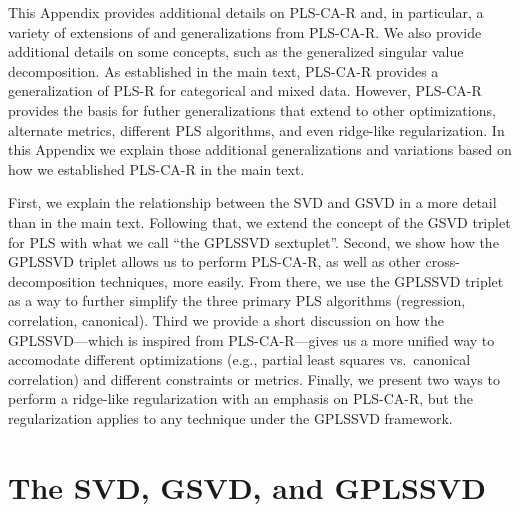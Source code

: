 \documentclass[12pt]{article}
\begin{document}
This Appendix provides additional details on PLS-CA-R and, in
particular, a variety of extensions of and generalizations from
PLS-CA-R. We also provide additional details on some concepts, such as
the generalized singular value decomposition. As established in the main
text, PLS-CA-R provides a generalization of PLS-R for categorical and
mixed data. However, PLS-CA-R provides the basis for futher
generalizations that extend to other optimizations, alternate metrics,
different PLS algorithms, and even ridge-like regularization. In this
Appendix we explain those additional generalizations and variations
based on how we established PLS-CA-R in the main text.

First, we explain the relationship between the SVD and GSVD in a more
detail than in the main text. Following that, we extend the concept of
the GSVD triplet for PLS with what we call ``the GPLSSVD sextuplet''.
Second, we show how the GPLSSVD triplet allows us to perform PLS-CA-R,
as well as other cross-decomposition techniques, more easily. From
there, we use the GPLSSVD triplet as a way to further simplify the three
primary PLS algorithms (regression, correlation, canonical). Third we
provide a short discussion on how the GPLSSVD---which is inspired from
PLS-CA-R---gives us a more unified way to accomodate different
optimizations (e.g., partial least squares vs.~canonical correlation)
and different constraints or metrics. Finally, we present two ways to
perform a ridge-like regularization with an emphasis on PLS-CA-R, but
the regularization applies to any technique under the GPLSSVD framework.

\hypertarget{the-svd-gsvd-and-gplssvd}{%
\section{The SVD, GSVD, and GPLSSVD}\label{the-svd-gsvd-and-gplssvd}}
\end{document}
